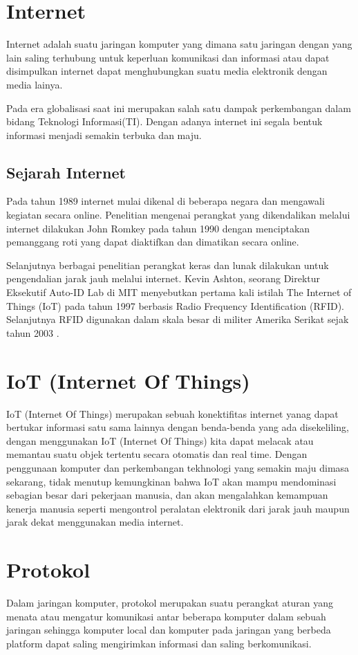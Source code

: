 \section{Internet}
Internet adalah suatu jaringan komputer yang dimana satu jaringan dengan yang lain saling terhubung untuk keperluan komunikasi dan informasi atau dapat disimpulkan internet dapat menghubungkan suatu media elektronik dengan media lainya.

Pada era globalisasi saat ini merupakan salah satu dampak perkembangan dalam bidang Teknologi Informasi(TI). Dengan adanya internet ini segala bentuk informasi menjadi semakin terbuka dan maju.

\subsection{Sejarah Internet}
Pada tahun 1989 internet mulai dikenal di beberapa negara dan mengawali kegiatan secara online.
Penelitian mengenai perangkat yang dikendalikan melalui internet dilakukan John Romkey pada tahun 1990
dengan menciptakan  pemanggang roti yang dapat diaktifkan dan dimatikan secara online.

Selanjutnya berbagai penelitian  perangkat  keras  dan  lunak dilakukan untuk pengendalian jarak jauh melalui internet.
Kevin Ashton, seorang Direktur Eksekutif Auto-ID Lab di MIT menyebutkan pertama kali istilah The Internet of Things (IoT)
pada tahun 1997 berbasis Radio Frequency  Identification (RFID). Selanjutnya  RFID digunakan dalam skala besar di militer
Amerika Serikat sejak tahun 2003 \cite{wilianto2018sejarah}.

\section{IoT (Internet Of Things)}
IoT (Internet Of Things) merupakan sebuah konektifitas internet yanag dapat bertukar informasi
satu sama lainnya dengan benda-benda yang ada disekeliling, dengan menggunakan IoT (Internet Of Things) kita dapat melacak atau memantau suatu objek tertentu secara otomatis dan real time.
Dengan penggunaan komputer dan perkembangan tekhnologi yang semakin maju dimasa sekarang, tidak menutup kemungkinan bahwa IoT akan mampu mendominasi sebagian besar dari pekerjaan manusia, dan akan mengalahkan kemampuan kenerja manusia seperti mengontrol peralatan
elektronik dari jarak jauh maupun jarak dekat menggunakan media internet.

\section{Protokol}
Dalam jaringan komputer, protokol merupakan suatu perangkat aturan yang menata atau mengatur komunikasi antar beberapa komputer dalam sebuah jaringan sehingga komputer local dan komputer pada jaringan yang berbeda platform dapat saling mengirimkan informasi dan saling berkomunikasi.

